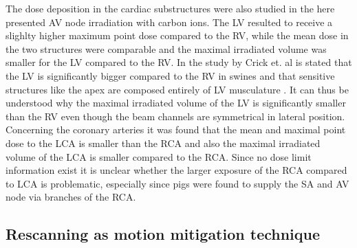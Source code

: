 \documentclass[type=dr, dr=rernat, accentcolor=tud7b,colorbacktitle, bigchapter, openright, twoside, 12pt ]{tudthesis}
\begin{document}
\newline
The dose deposition in the cardiac substructures were also studied in the here presented AV node irradiation with carbon ions. The LV resulted 
to receive a slighlty higher maximum point dose compared to the RV, while the mean dose in the two structures were comparable and the 
maximal irradiated volume was smaller for the LV compared to the RV. In the study by Crick et. al is stated that the LV is significantly bigger compared to 
the RV in swines and that sensitive structures like the apex are composed entirely of LV musculature \cite{Cri98}. It can thus be understood why the 
maximal irradiated volume of the LV is significantly smaller than the RV even though the beam channels are symmetrical in lateral position. 
Concerning the coronary arteries it was found that the mean and maximal point dose to the LCA is smaller than the RCA and also the maximal 
irradiated volume of the LCA is smaller compared to the RCA. Since no dose limit information exist it is unclear whether the larger exposure of the 
RCA compared to LCA is problematic, especially since pigs were found to supply the SA and AV node via branches of the RCA.



\vspace*{-0.3cm}
\subsection{Rescanning as motion mitigation technique}
\end{document}
